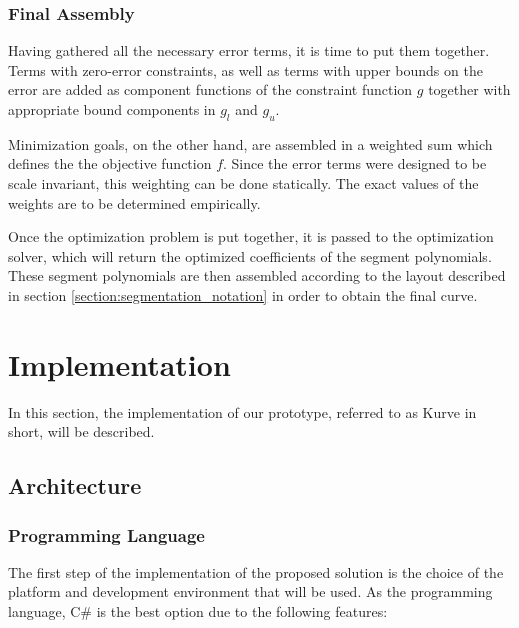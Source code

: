 \documentclass[a4paper]{article}
\begin{document}
			\subsubsection{Final Assembly}
			\label{section:final_assembly}

				Having gathered all the necessary error terms, it is time to put them together. Terms with zero-error constraints, as well as terms with upper bounds on the error are added as component functions of the constraint function \(g\) together with appropriate bound components in \(g_l\) and \(g_u\).

				Minimization goals, on the other hand, are assembled in a weighted sum which defines the the objective function \(f\). Since the error terms were designed to be scale invariant, this weighting can be done statically. The exact values of the weights are to be determined empirically.

				Once the optimization problem is put together, it is passed to the optimization solver, which will return the optimized coefficients of the segment polynomials. These segment polynomials are then assembled according to the layout described in section \ref{section:segmentation_notation} in order to obtain the final curve.

	\section{Implementation}
	
		In this section, the implementation of our prototype, referred to as Kurve in short, will be described.

		\subsection{Architecture}
			
			\subsubsection{Programming Language}
			
				The first step of the implementation of the proposed solution is the choice of the platform and development environment that will be used. 
				As the programming language, C\# is the best option due to the following features:
				
\end{document}
